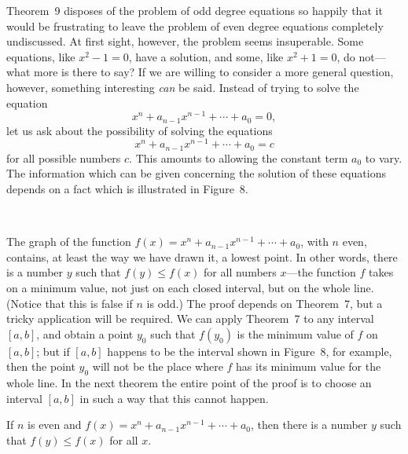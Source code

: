 Theorem~9 disposes of the problem of odd degree equations so happily that it
would be frustrating to leave the problem of even degree equations completely
undiscussed. At first sight, however, the problem seems insuperable. Some
equations, like $x^2-1=0$, have a solution, and some, like $x^2+1=0$, do
not---what more is there to say? If we are willing to consider a more general
question, however, something interesting \emph{can} be said. Instead of trying
to solve the equation
\[
x^n + a_{n-1}x^{n-1} + \cdots + a_0 = 0,
\]
let us ask about the possibility of solving the equations
\[
x^n + a_{n-1}x^{n-1} + \cdots + a_0 = c
\]
for all possible numbers $c$. This amounts to allowing the constant term $a_0$
to vary. The information which can be given concerning the solution of these
equations depends on a fact which is illustrated in Figure~8.
\begin{center}
\\[0.6em]
\end{center}
The graph of the function $f(x)=x^n+a_{n-1}x^{n-1}+\cdots+a_0$, with $n$ even,
contains, at least the way we have drawn it, a lowest point. In other words,
there is a number $y$ such that $f(y)\leq f(x)$ for all numbers $x$---the
function $f$ takes on a minimum value, not just on each closed interval, but on
the whole line. (Notice that this is false if $n$ is odd.) The proof depends on
Theorem~7, but a tricky application will be required. We can apply Theorem~7 to
any interval $[a,b]$, and obtain a point $y_0$ such that $f(y_0)$ is the
minimum value of $f$ on $[a,b]$; but if $[a,b]$ happens to be the interval
shown in Figure~8, for example, then the point $y_0$ will not be the place
where $f$ has its minimum value for the whole line. In the next theorem the
entire point of the proof is to choose an interval $[a,b]$ in such a way that
this cannot happen.

\begin{theorem}
If $n$ is even and $f(x)=x^n+a_{n-1}x^{n-1}+\cdots+a_0$, then there is a number
$y$ such that $f(y)\leq f(x)$ for all $x$.
\end{theorem}


